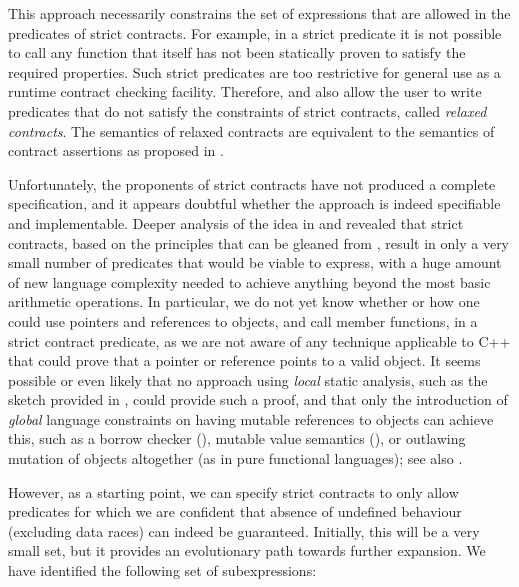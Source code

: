 This approach necessarily  constrains the set of expressions that are allowed in the predicates of strict contracts. For example, in a strict predicate it is not possible to call any function that itself has not been statically proven to satisfy the required properties. Such strict predicates are too restrictive for general use as a runtime contract checking facility. Therefore, \cite{P2680R1} and \cite{P3285R0} also allow the user to write predicates that do not satisfy the constraints of strict contracts, called \emph{relaxed contracts}. The semantics of relaxed contracts are equivalent to the semantics of contract assertions as proposed in \cite{P2900R13}.

Unfortunately, the proponents of strict contracts have not produced a complete specification, and it appears doubtful whether the approach is indeed specifiable and implementable. Deeper analysis of the idea in \cite{P3376R0} and \cite{P3386R0} revealed that strict contracts, based on the principles that can be gleaned from \cite{P3285R0}, result in only a very small number of predicates that would be viable to express, with a huge amount of new language complexity needed to achieve anything beyond the most basic arithmetic operations. In particular, we do not yet know whether or how one could use pointers and references to objects, and call member functions, in a strict contract predicate, as we are not aware of any technique applicable to C++ that could prove that a pointer or reference points to a valid object. It seems possible or even likely that no approach using \emph{local} static analysis, such as the  sketch provided in \cite{P3285R0}, could provide such a proof, and that only the introduction of \emph{global} language constraints on having mutable references to objects can achieve this, such as a borrow checker (\cite{P3390R0}), mutable value semantics (\cite{Racordon2022}), or outlawing mutation of objects altogether (as in pure functional languages); see also \cite{Baxter2024}.

However, as a starting point, we can specify strict contracts to only allow predicates for which we are confident that absence of undefined behaviour (excluding data races) can indeed be guaranteed. Initially, this will be a very small set, but it provides an evolutionary path towards further expansion. We have identified the following set of subexpressions:

